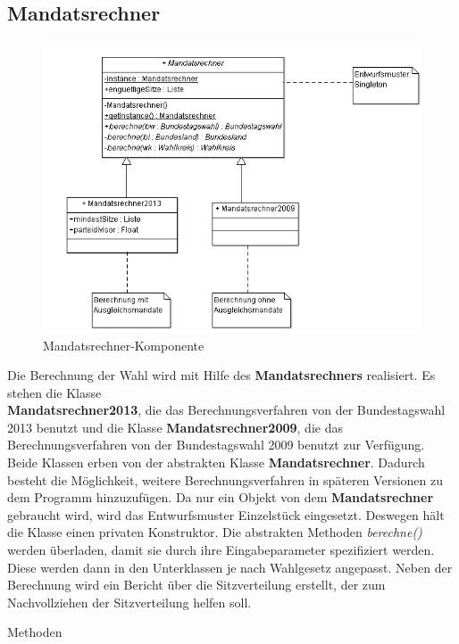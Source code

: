\documentclass[12pt,a4paper,titlepage]{article}
\newcommand{\myma}{\fontfamily{pcr}\selectfont \textbf}
\newcommand{\mymo}{\fontfamily{pcr}\selectfont \textit}
\begin{document}
\newpage
\subsection{Mandatsrechner}
\begin{figure}[!ht]
\centering
\includegraphics[scale=0.6]{Mandatsrechneralles.png} \caption{Mandatsrechner-Komponente} 
\end{figure}
Die Berechnung der Wahl wird mit Hilfe des {\myma{Mandatsrechners}} realisiert. Es stehen die Klasse \\{\myma{Mandatsrechner2013}}, die das Berechnungsverfahren von der Bundestagswahl 2013 benutzt und die Klasse {\myma{Mandatsrechner2009}}, die das Berechnungsverfahren von der Bundestagswahl 2009 benutzt zur Verfügung. Beide Klassen erben von der abstrakten Klasse {\myma{Mandatsrechner}}. Dadurch besteht die Möglichkeit, weitere Berechnungsverfahren in späteren Versionen zu dem Programm hinzuzufügen. Da nur ein Objekt von dem {\myma{Mandatsrechner}} gebraucht wird, wird das Entwurfsmuster Einzelstück eingesetzt. Deswegen hält die Klasse einen privaten Konstruktor. Die abstrakten Methoden {\mymo{berechne()}} werden überladen, damit sie durch ihre Eingabeparameter spezifiziert werden. Diese werden dann in den Unterklassen je nach Wahlgesetz angepasst. Neben der Berechnung wird ein Bericht über die Sitzverteilung erstellt, der zum Nachvollziehen der Sitzverteilung helfen soll.
\begin{large}
Methoden 
\end{large}
\end{document}
